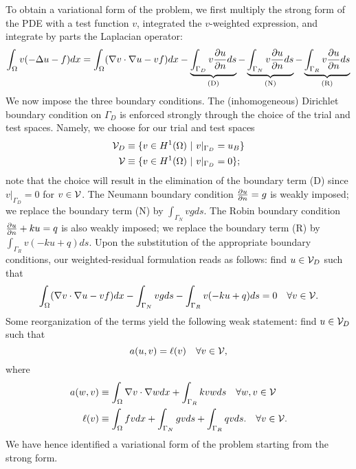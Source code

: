 To obtain a variational form of the problem, we first multiply the strong form of the PDE with a test function $v$, integrated the $v$-weighted expression, and integrate by parts the Laplacian operator:
\begin{align*}
  \int_{\Omega} v (-\Delta u - f) dx
  =
  \int_{\Omega} (\nabla v \cdot \nabla u - v f) dx
  - \underbrace{\int_{\Gamma_D} v \frac{\partial u}{\partial n} ds}_{\text{(D)}}
  - \underbrace{\int_{\Gamma_N} v \frac{\partial u}{\partial n} ds}_{\text{(N)}}
  - \underbrace{\int_{\Gamma_R} v \frac{\partial u}{\partial n} ds}_{\text{(R)}}
\end{align*}
We now impose the three boundary conditions. The (inhomogeneous) Dirichlet boundary condition on $\Gamma_D$ is enforced strongly through the choice of the trial and test spaces.  Namely, we choose for our trial and test spaces
\begin{align*}
  \mathcal{V}_D &\equiv \{ v \in H^1(\Omega) \ | \ v|_{\Gamma_D} = u_B \} \\
  \mathcal{V} &\equiv \{ v \in H^1(\Omega) \ | \ v|_{\Gamma_D} = 0 \};
\end{align*}
note that the choice will result in the elimination of the boundary term (D) since $v|_{\Gamma_D} = 0$ for $v \in \mathcal{V}$. The Neumann boundary condition $\frac{\partial u}{\partial n} = g$ is weakly imposed; we replace the boundary term (N) by $\int_{\Gamma_N} v g ds$.  The Robin boundary condition $\frac{\partial u}{\partial n} + k u = q$ is also weakly imposed; we replace the boundary term (R) by $\int_{\Gamma_R} v (-ku + q) ds$.  Upon the substitution of the appropriate boundary conditions, our weighted-residual formulation reads as follows: find $u \in \mathcal{V}_D$ such that
\begin{equation*}
  \int_\Omega (\nabla v \cdot \nabla u - v f) dx
  - \int_{\Gamma_N} v g ds - \int_{\Gamma_R} v (-ku + q) ds = 0
  \quad \forall v \in \mathcal{V}.
\end{equation*}
Some reorganization of the terms yield the following weak statement: find $u \in \mathcal{V}_D$ such that
\begin{equation*}
  a(u,v) = \ell(v) \quad \forall v \in \mathcal{V},
\end{equation*}
where
\begin{align*}
  a(w,v) &\equiv \int_\Omega \nabla v \cdot \nabla w dx + \int_{\Gamma_R} k vw ds \quad \forall w, v \in \mathcal{V} \\
  \ell(v) &\equiv \int_\Omega fv dx + \int_{\Gamma_N} gv ds + \int_{\Gamma_R} qv ds.
  \quad \forall v \in \mathcal{V}.
\end{align*}
We have hence identified a variational form of the problem starting from the strong form.

